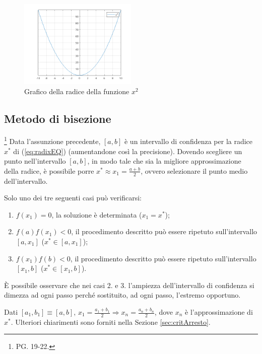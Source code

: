 \begin{figure}
	\centering
	\includegraphics[width=0.5\textwidth]{immagini/Radix.png}
	\caption{\label{fig:SingleRadix}Grafico della radice della funzione $x^2$}
\end{figure}

\subsection{Metodo di bisezione}\footnote{PG. 19-22.} Data l'assunzione precedente, $[a,b]$ è un intervallo di confidenza per la radice $x^*$ di (\ref{eq:radixEQ}) (aumentandone così la precisione). Dovendo scegliere un punto nell'intervallo $[a,b]$, in modo tale che sia la migliore approssimazione della radice, è possibile porre $x^*\approx x_1=\frac{a+b}{2}$, ovvero selezionare il punto medio dell'intervallo.

Solo uno dei tre seguenti casi può verificarsi:
\begin{enumerate}
	\item $f(x_1)=0$, la soluzione è determinata ($x_1=x^*$);
	\item $f(a)f(x_1)<0$, il procedimento descritto può essere ripetuto sull'intervallo $[a, x_1]$ ($x^*\in[a, x_1]$);
	\item $f(x_1)f(b)<0$, il procedimento descritto può essere ripetuto sull'intervallo $[x_1, b]$ ($x^*\in[x_1, b]$).
\end{enumerate}

\begin{remark}
	È possibile osservare che nei casi 2. e 3. l'ampiezza dell'intervallo di confidenza si dimezza ad ogni passo perché sostituito, ad ogni passo, l'estremo opportuno.
\end{remark}

\begin{remark}
	Dati $[a_1,b_1]\equiv [a,b],\, x_1=\frac{a_1+b_1}{2}\Rightarrow x_n=\frac{a_n+b_n}{2}$, dove $x_n$ è l'approssimazione di $x^*$. Ulteriori chiarimenti sono forniti nella Sezione \ref{sec:critArresto}.
\end{remark}

